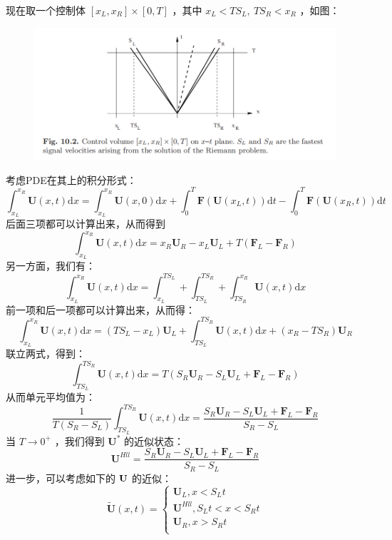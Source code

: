 \documentclass{book}
\begin{document}
现在取一个控制体 $[x_L,x_R]\times[0,T]$ ，其中 $x_L<TS_L,\ TS_R<x_R$ ，如图：
\begin{figure}[htp]
  \centering
  \label{fig:}
  \includegraphics[width=0.7\linewidth]{fig/HLL.png}
  \caption{}
\end{figure}
考虑PDE在其上的积分形式：
\begin{equation}
  \displaystyle\int_{x_L}^{x_R}\mathbf U(x,t)\mathrm dx=\displaystyle\int_{x_L}^{x_R}\mathbf U(x,0)\mathrm dx+\int_{0}^T\mathbf F(\mathbf U(x_L,t))\mathrm dt-\int_0^T\mathbf F(\mathbf U(x_R,t))\mathrm dt
\end{equation}
后面三项都可以计算出来，从而得到
\begin{equation}
  \displaystyle\int_{x_L}^{x_R}\mathbf U(x,t)\mathrm dx=x_R\mathbf U_R-x_L\mathbf U_L+T(\mathbf F_L-\mathbf F_R)
\end{equation}
另一方面，我们有：
\begin{equation}
  \displaystyle\int_{x_L}^{x_R}\mathbf U(x,t)\mathrm dx=\int_{x_L}^{TS_L}+\int_{TS_L}^{TS_R}+\int_{TS_R}^{x_R}\mathbf U(x,t)\mathrm dx
\end{equation}
前一项和后一项都可以计算出来，从而得：
\begin{equation}
  \displaystyle\int_{x_L}^{x_R}\mathbf U(x,t)\mathrm dx=(TS_L-x_L)\mathbf U_L+\int_{TS_L}^{TS_R}\mathbf U(x,t)\mathrm dx+(x_R-TS_R)\mathbf U_R
\end{equation}
联立两式，得到：
\begin{equation}
  \displaystyle\int_{TS_L}^{TS_R}\mathbf U(x,t)\mathrm dx=T(S_R\mathbf U_R-S_L\mathbf U_L+\mathbf F_L-\mathbf F_R)
\end{equation}
从而单元平均值为：
\begin{equation}
  \displaystyle\frac{1}{T(S_R-S_L)}\int_{TS_L}^{TS_R}\mathbf U(x,t)\mathrm dx=\frac{S_R\mathbf U_R-S_L\mathbf U_L+\mathbf F_L-\mathbf F_R}{S_R-S_L}
\end{equation}
当 $T\to0^+$ ，我们得到 $\mathbf U^*$ 的近似状态：
\begin{equation}
  \mathbf U^{Hll}=\displaystyle\frac{S_R\mathbf U_R-S_L\mathbf U_L+\mathbf F_L-\mathbf F_R}{S_R-S_L}
\end{equation}
进一步，可以考虑如下的 $\bf U$ 的近似：
\begin{equation}
  \mathbf{\tilde{U}}\left( x,t \right) =\begin{cases}
    \mathbf{U}_L,x<S_Lt          \\
    \mathbf{U}^{Hll},S_Lt<x<S_Rt \\
    \mathbf{U}_R,x>S_Rt          \\
  \end{cases}
\end{equation}
\end{document}
